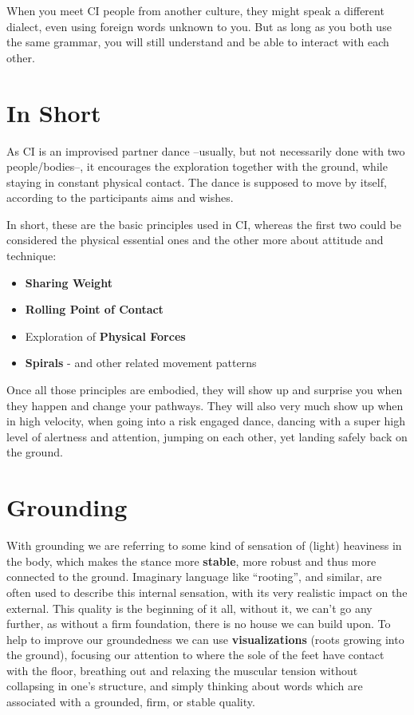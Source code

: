 When you meet CI people from another culture, they might speak a different dialect, even using foreign words unknown to you.
But as long as you both use the same grammar, you will still understand and be able to interact with each other.

\section{In Short}\label{sec:in-short}

As CI is an improvised partner dance --usually, but not necessarily done with two people/bodies--, it encourages the exploration together with the ground, while staying in constant physical contact.
The dance is supposed to move by itself, according to the participants aims and wishes.

In short, these are the basic principles used in CI, whereas the first two could be considered the physical essential ones and the other more about attitude and technique:

\begin{itemize}
    \setlength\itemsep{0em}
    \item \textbf{Sharing Weight}
    \item \textbf{Rolling Point of Contact}
    \item Exploration of \textbf{Physical Forces}
    \item \textbf{Spirals} - and other related movement patterns
\end{itemize}

Once all those principles are embodied, they will show up and surprise you when they happen and change your pathways.
They will also very much show up when in high velocity, when going into a risk engaged dance, dancing with a super high level of alertness and attention, jumping on each other, yet landing safely back on the ground.

\section{Grounding}\label{sec:grounding}

With grounding we are referring to some kind of sensation of (light) heaviness in the body, which makes the stance more \textbf{stable}, more robust and thus more connected to the ground.
Imaginary language like ``rooting'', and similar, are often used to describe this internal sensation, with its very realistic impact on the external.
This quality is the beginning of it all, without it, we can't go any further, as without a firm foundation, there is no house we can build upon.
To help to improve our groundedness we can use \textbf{visualizations} (roots growing into the ground), focusing our attention to where the sole of the feet have contact with the floor, breathing out and relaxing the muscular tension without collapsing in one's structure, and simply thinking about words which are associated with a grounded, firm, or stable quality.

